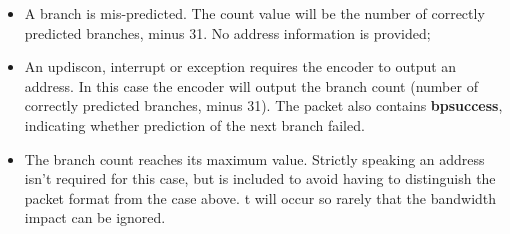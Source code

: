 \begin{itemize}
  \item A branch is mis-predicted.  The count value will be the number of correctly predicted branches, 
    minus 31.  No address information is provided;
  \item An updiscon, interrupt or exception requires the encoder to output an address.  In this case 
    the encoder will output the branch count (number of correctly predicted branches, minus 31).  The packet 
    also contains \textbf{bpsuccess}, indicating whether prediction of the next branch failed.
  \item The branch count reaches its maximum value.  Strictly speaking an address isn't required for this case, 
    but is included to avoid having to distinguish the packet format from the case above.  t will occur so rarely 
    that the bandwidth impact can be ignored.
\end{itemize}

